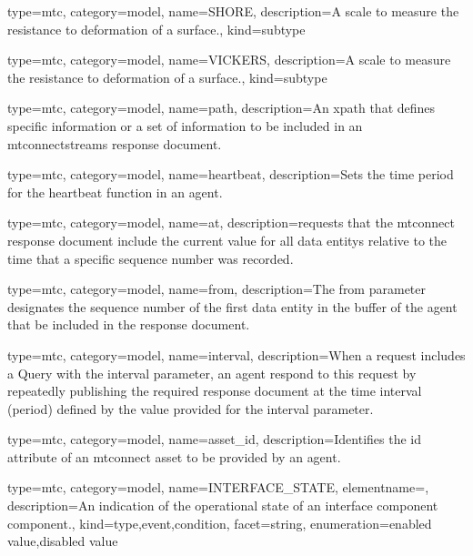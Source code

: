 {
  type=mtc,
  category=model,
  name={SHORE},
  description={A scale to measure the resistance to deformation of a surface.},
  kind={subtype}
}


{
  type=mtc,
  category=model,
  name={VICKERS},
  description={A scale to measure the resistance to deformation of a surface.},
  kind={subtype}
}

{
  type=mtc,
  category=model,
  name={path},
  description={An \gls{xpath} that defines specific information or a set of information to be included in an \gls{mtconnectstreams response document}.}
}

{
  type=mtc,
  category=model,
  name={heartbeat},
  description={Sets the time period for the heartbeat function in an \gls{agent}.}
}


{
  type=mtc,
  category=model,
  name={at},
  description={\glspl{request} that the \gls{mtconnect response document} \MUST include the current value for all \glspl{data entity} relative to the time that a specific sequence number was recorded.}
}

{
  type=mtc,
  category=model,
  name={from},
  description={The from parameter designates the sequence number of the first \gls{data entity} in the buffer of the \gls{agent} that \MUST be included in the \gls{response document}.}
}



{
  type=mtc,
  category=model,
  name={interval},
  description={When a \gls{request} includes a Query with the interval parameter, an \gls{agent} \MUST respond to this \gls{request} by repeatedly publishing the required \gls{response document} at the time interval (period) defined by the value provided for the interval parameter.}
}


{
  type=mtc,
  category=model,
  name={asset\_id},
  description={Identifies the id attribute of an \gls{mtconnect asset} to be provided by an \gls{agent}.}
}



{
  type=mtc,
  category=model,
  name={INTERFACE\_STATE},
  elementname=,
  description={An indication of the operational state of an \gls{interface component} component.},
  kind={type,event,condition},
  facet={\gls{string}},
  enumeration={\gls{enabled value},\gls{disabled value}}
}


